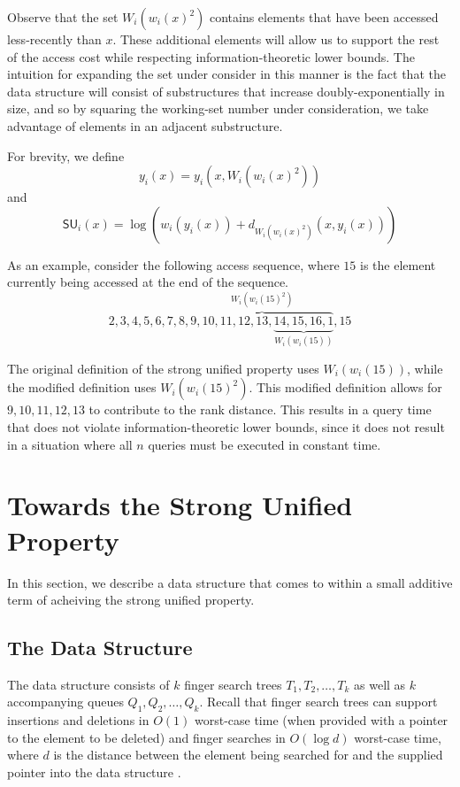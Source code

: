 \documentclass{llncs}
\newcommand{\BigOh}[1]{O\!\left(#1\right)}
\newcommand{\SU}[1]{\textsf{SU}_i\!\left(#1\right)}
\begin{document}
Observe that the set $W_i(w_i(x)^2)$ contains elements that have been accessed less-recently than $x$. These additional elements will allow us to support the rest of the access cost while respecting information-theoretic lower bounds. The intuition for expanding the set under consider in this manner is the fact that the data structure will consist of substructures that increase doubly-exponentially in size, and so by squaring the working-set number under consideration, we take advantage of elements in an adjacent substructure.

For brevity, we define
\begin{displaymath}
	y_i(x) = y_i(x,W_i(w_i(x)^2))
\end{displaymath}
and
\begin{displaymath}
	\SU{x} = \log (w_i(y_i(x)) + d_{W_i(w_i(x)^2)}(x,y_i(x)))
\end{displaymath}

As an example, consider the following access sequence, where $15$ is the element currently being accessed at the end of the sequence.
\begin{displaymath}
2, 3, 4, 5, 6, 7, 8, \overbrace{9, 10, 11, 12, 13, \underbrace{14, 15, 16, 1}_{W_i(w_i(15))}}^{W_i(w_i(15)^2)}, 15
\end{displaymath}

The original definition of the strong unified property uses $W_i(w_i(15))$, while the modified definition uses $W_i(w_i(15)^2)$. This modified definition allows for $9,10,11,12,13$ to contribute to the rank distance. This results in a query time that does not violate information-theoretic lower bounds, since it does not result in a situation where all $n$ queries must be executed in constant time. 

\section{Towards the Strong Unified Property}
\label{section:main}

In this section, we describe a data structure that comes to within a small additive term of acheiving the strong unified property.

\subsection{The Data Structure}
\label{section:main:datastructure}

The data structure consists of $k$ finger search trees $T_1,T_2,\ldots,T_k$ as well as $k$ accompanying queues $Q_1,Q_2,\ldots,Q_k$. Recall that finger search trees can support insertions and deletions in $\BigOh{1}$ worst-case time (when provided with a pointer to the element to be deleted) and finger searches in $\BigOh{\log d}$ worst-case time, where $d$ is the distance between the element being searched for and the supplied pointer into the data structure \cite{DBLP:journals/jcss/BrodalLMTT03}. 
\end{document}
